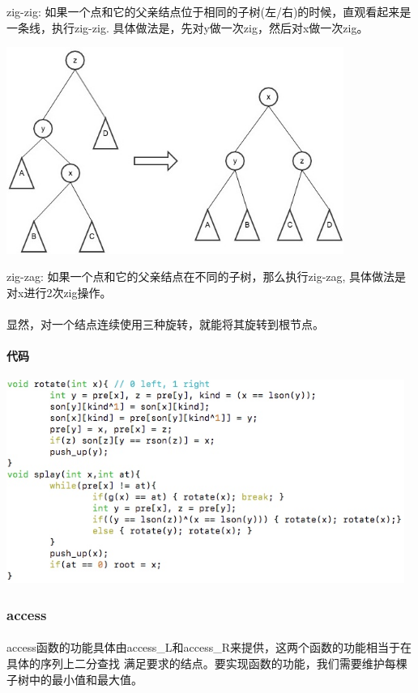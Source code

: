 \documentclass{article}
\begin{document}
			zig-zig: 如果一个点和它的父亲结点位于相同的子树(左/右)的时候，直观看起来是一条线，执行zig-zig.
			具体做法是，先对y做一次zig，然后对x做一次zig。
			\begin{center}
			\includegraphics[width = 11cm]{zig-zag.jpg}\\
			\end{center}
			zig-zag: 如果一个点和它的父亲结点在不同的子树，那么执行zig-zag, 具体做法是对x进行2次zig操作。
		\paragraph{}
			显然，对一个结点连续使用三种旋转，就能将其旋转到根节点。
		\paragraph{代码}
			\begin{center}
			\includegraphics[width = 13cm]{splay_code.jpeg}\\
			\end{center}
	\subsubsection{access}
		\paragraph{}
			access函数的功能具体由access\_L和access\_R来提供，这两个函数的功能相当于在具体的序列上二分查找
			满足要求的结点。要实现函数的功能，我们需要维护每棵子树中的最小值和最大值。
\end{document}
